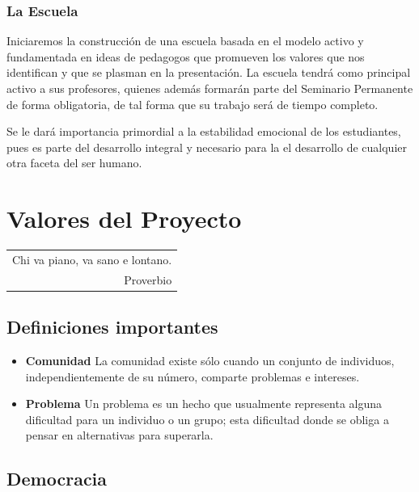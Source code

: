 \documentclass[10pt,letterpaper,oneside]{book}
\makeatletter
\newenvironment{myepigraph}
  {\par\hfill\itshape
   \begin{tabular}{@{}r@{\hspace{2em}}}} %
  {\end{tabular}\par\medskip}
\makeatother
\begin{document}
\subsection{La Escuela}
Iniciaremos la construcción de una escuela basada en el modelo activo y fundamentada en ideas de pedagogos que promueven los valores que nos identifican y que se plasman en la presentación. La escuela tendrá como principal activo  a sus profesores, quienes además formarán parte del Seminario Permanente de forma obligatoria, de tal forma que su trabajo será de tiempo completo.

Se le dará importancia primordial a la estabilidad emocional de los estudiantes, pues es parte del desarrollo integral y necesario para la el desarrollo de cualquier otra faceta del ser humano.


\chapter{Valores del Proyecto}

\begin{myepigraph}
Chi va piano, va sano e lontano.
\vspace{0.1cm}\\
Proverbio
\end{myepigraph}

\section*{Definiciones importantes}
\begin{itemize}

	\item {\bf Comunidad}	
La comunidad existe sólo cuando un conjunto de individuos, independientemente de su número, comparte problemas e intereses.
	
	\item {\bf Problema}
	Un problema es un hecho que usualmente representa alguna dificultad para un individuo o un grupo; esta dificultad donde se obliga a pensar en alternativas para superarla.
\end{itemize}

	\section{Democracia} 
\end{document}
